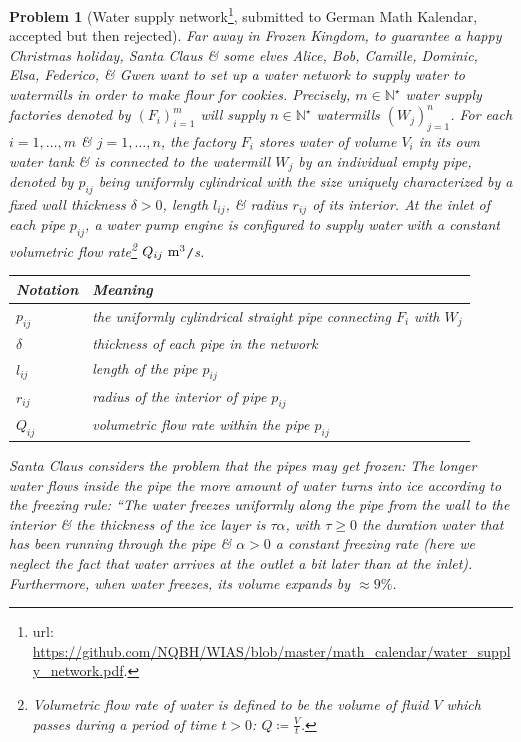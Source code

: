 \documentclass[12pt]{article}
\newtheorem{problem}{Problem}
\begin{document}
\begin{problem}[Water supply network\footnote{{\sc url}: \url{https://github.com/NQBH/WIAS/blob/master/math_calendar/water_supply_network.pdf}.}, submitted to German {\sc Math Kalendar}, accepted but then rejected]
	Far away in Frozen Kingdom, to guarantee a happy Christmas holiday, Santa Claus \& some elves Alice, Bob, Camille, Dominic, Elsa, Federico, \& Gwen want to set up a water network to supply water to watermills in order to make flour for cookies. Precisely, $m\in\mathbb{N}^\star$ water supply factories denoted by $(F_i)_{i=1}^m$ will supply $n\in\mathbb{N}^\star$ watermills $(W_j)_{j=1}^n$. For each $i = 1,\ldots,m$ \& $j = 1,\ldots,n$, the factory $F_i$ stores water of volume $V_i$ in its own water tank \& is connected to the watermill $W_j$ by an individual empty pipe, denoted by $p_{ij}$ being uniformly cylindrical with the size uniquely characterized by a fixed wall thickness $\delta > 0$, length $l_{ij}$, \& radius $r_{ij}$ of its interior. At the inlet of each pipe $p_{ij}$, a water pump engine is configured to supply water with a constant \emph{volumetric flow rate}\footnote{{\it Volumetric flow rate} of water is defined to be the volume of fluid $V$ which passes during a period of time $t > 0$: $Q\coloneqq\frac{V}{t}$.} $Q_{ij}\ {\rm m}^3${\tt/}{\rm s}.
	\begin{table}[H]
		\centering
		\begin{tabular}{|l|l|}
			\hline
			Notation & Meaning \\
			\hline
			$p_{ij}$ & the uniformly cylindrical straight pipe connecting $F_i$ with $W_j$ \\
			\hline
			$\delta$ & thickness of each pipe in the network \\
			\hline
			$l_{ij}$ & length of the pipe $p_{ij}$ \\
			\hline
			$r_{ij}$ & radius of the interior of pipe $p_{ij}$ \\
			\hline
			$Q_{ij}$ & volumetric ﬂow rate within the pipe $p_{ij}$ \\
			\hline
		\end{tabular}
	\end{table}
	Santa Claus considers the problem that the pipes may get frozen: The longer water flows inside the pipe the more amount of water turns into ice according to the \emph{freezing rule}: ``The water freezes uniformly along the pipe from the wall to the interior \& the thickness of the ice layer is $\tau\alpha$, with $\tau\ge0$ the duration water that has been running through the pipe \& $\alpha > 0$ a constant freezing rate (here we neglect the fact that water arrives at the outlet a bit later than at the inlet). Furthermore, when water freezes, its volume expands by $\approx9\%$.
	

\end{problem}
\end{document}
